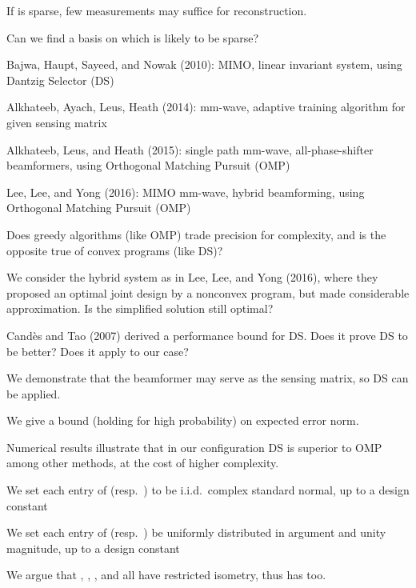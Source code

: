 {
\blank [big]

\I If  is sparse, few measurements may suffice for reconstruction.

\I Can we find a basis on which  is likely to be sparse?
}
{
\I Bajwa, Haupt, Sayeed, and Nowak (2010): MIMO, linear invariant system, using Dantzig Selector (DS)

\I Alkhateeb, Ayach, Leus, Heath (2014): mm-wave, adaptive training algorithm for given sensing matrix

\I Alkhateeb, Leus, and Heath (2015): single path mm-wave, all-phase-shifter beamformers, using Orthogonal Matching Pursuit (OMP)

\I Lee, Lee, and Yong (2016): MIMO mm-wave, hybrid beamforming, using Orthogonal Matching Pursuit (OMP)
}
{
\I Does greedy algorithms (like OMP) trade precision for complexity, and is the opposite true of convex programs (like DS)?

\I We consider the hybrid system as in Lee, Lee, and Yong (2016), where they proposed an optimal joint design by a nonconvex program, but made considerable approximation.
Is the simplified solution still optimal?

\I Candès and Tao (2007) derived a performance bound for DS.
Does it prove DS to be better?
Does it apply to our case?
}
{
\I We demonstrate that the beamformer may serve as the sensing matrix, so DS can be applied.

\I We give a bound (holding for high probability) on expected error norm.

\I Numerical results illustrate that in our configuration DS is superior to OMP among other methods, at the cost of higher complexity.
}
{
\I We set each entry of  (resp.\ ) to be i.i.d.\ complex standard normal, up to a design constant

\I We set each entry of  (resp.\ ) be uniformly distributed in argument and unity magnitude, up to a design constant

\I We argue that , , , and  all have restricted isometry, thus  has too.
}
